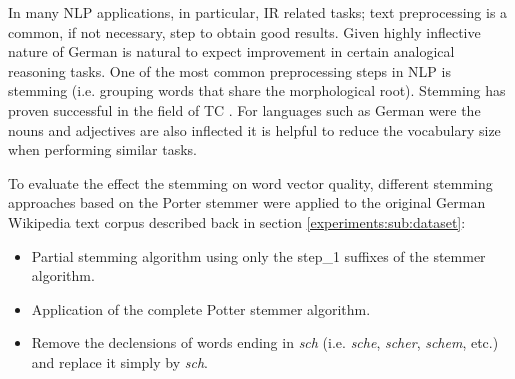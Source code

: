 In many \ac{NLP} applications, in particular, \ac{IR} related tasks;  text preprocessing is a common, if not
necessary, step to obtain good results. Given highly inflective nature of
German is natural to expect improvement in
certain analogical reasoning tasks.  One of the most common preprocessing steps in NLP is stemming (i.e. grouping
words that share the morphological root). Stemming has proven successful in
the field of \ac{TC} \cite{Sebastiani02}. For languages such as  German were the nouns and
adjectives are also inflected it is helpful to reduce the vocabulary size
when performing similar tasks.

To evaluate the effect the stemming on word vector quality, different
stemming approaches based on the Porter stemmer \cite{Porter80} were applied
to the original German  Wikipedia
text corpus described back in section \ref{experiments:sub:dataset}:

\begin{itemize} 
\item Partial stemming algorithm using only the step\_1 suffixes of the
  stemmer algorithm.
\item Application of the complete Potter stemmer algorithm.
\item Remove the declensions of words ending in  \textit{sch}  (i.e. \textit{sche}, \textit{scher},
\textit{schem}, etc.)  and replace it simply by \textit{sch}.
\end{itemize} 



